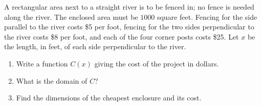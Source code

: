 A rectangular area next to a straight river is to be fenced in; no fence is needed along the river. The enclosed area must be $1000$ square feet. Fencing for the side parallel to the river costs \$5 per foot, fencing for the two sides perpendicular to the river costs \$8 per foot, and each of the four corner posts costs \$25. Let $x$ be the length, in feet, of each side perpendicular to the river.
\begin{enumerate}
\item[(a)] Write a function $C(x)$ giving the cost of the project in dollars.
\item[(b)] What is the domain of $C$?
\item[(c)] Find the dimensions of the cheapest enclosure and its cost.
\end{enumerate}
